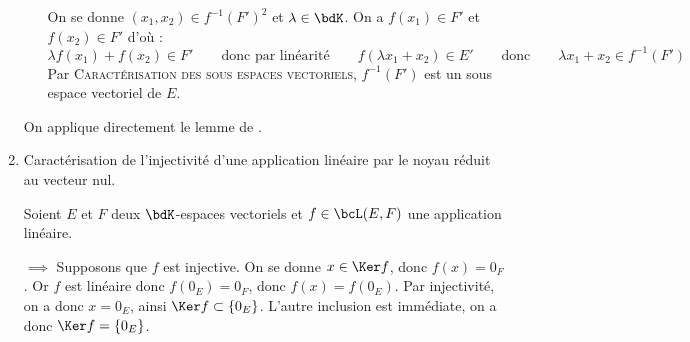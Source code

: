 \documentclass[a4paper,french,bookmarks]{article}
\begin{document}
\begin{enumerate}
\begin{nproof}
\begin{enumerate}
            On se donne $(x_1, x_2) \in f^{-1}(F')^2$ et $\lambda \in \bdK$. On a $f(x_1) \in F'$ et $f(x_2) \in F'$ d'où :
            \[\lambda f(x_1) + f(x_2) \in F' \qquad\text{donc par linéarité}\qquad f(\lambda x_1 + x_2) \in E' \qquad\text{donc}\qquad \lambda x_1 + x_2 \in f^{-1}(F')\]
            Par \textsc{Caractérisation des sous espaces vectoriels}, $f^{-1}(F')$ est un sous espace vectoriel de $E$.
            
            
        \end{enumerate}
	\end{nproof}
	\yesafter
	\begin{nproof}
        On applique directement le lemme de . 
    \end{nproof}
	\yesbefore
    
    \item Caractérisation de l'injectivité d'une application linéaire par le noyau réduit au vecteur nul.
    
    \noafter
    \nobefore
	\yesafter
	\begin{nproof}
        Soient $E$ et $F$ deux $\bdK$-espaces vectoriels et $f \in \bcL(E, F)$ une application linéaire.
        \begin{enumerate}
            \itt $\boxed{\implies}$ Supposons que $f$ est injective. On se donne $x \in \Ker f$, donc $f(x) = 0_F$. Or $f$ est linéaire donc $f(0_E) = 0_F$, donc $f(x) = f(0_E)$. Par injectivité, on a donc $x = 0_E$, ainsi $\Ker f \subset \{ 0_E\}$. L'autre inclusion est immédiate, on a donc $\Ker f = \{ 0_E \}$.
            

\end{enumerate}
\end{nproof}
\end{enumerate}
\end{document}
